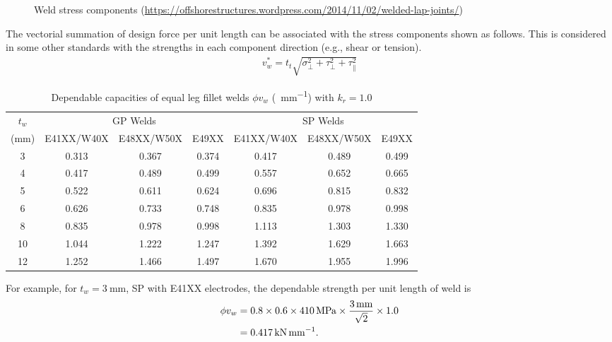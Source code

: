 \begin{figure}[H]
\centering

\caption{Weld stress components (\href{https://offshorestructures.wordpress.com/2014/11/02/welded-lap-joints/}{\url{https://offshorestructures.wordpress.com/2014/11/02/welded-lap-joints/}})}
\end{figure}
The vectorial summation of design force per unit length can be associated with the stress components shown as follows. This is considered in some other standards with the strengths in each component direction (e.g., shear or tension).
\begin{gather}
v_w^*=t_t\sqrt{\sigma_\perp^2+\tau_\perp^2+\tau_\parallel^2}
\end{gather}
\begin{table}[H]
\centering\footnotesize
\caption{Dependable capacities of equal leg fillet welds $\phi{}v_w$ (\si{\kn\per\mm}) with $k_r=1.0$}\label{tab:phi_v_w}
\begin{tabular}{c|c|c|c|c|c|c}
    \toprule
      $t_w$    &  \multicolumn{3}{c|}{GP Welds}  &  \multicolumn{3}{c}{SP Welds}   \\
    (\si{\mm}) & E41XX/W40X & E48XX/W50X & E49XX & E41XX/W40X & E48XX/W50X & E49XX \\ \midrule
        3      &   0.313    &   0.367    & 0.374 &   0.417    &   0.489    & 0.499 \\
        4      &   0.417    &   0.489    & 0.499 &   0.557    &   0.652    & 0.665 \\
        5      &   0.522    &   0.611    & 0.624 &   0.696    &   0.815    & 0.832 \\
        6      &   0.626    &   0.733    & 0.748 &   0.835    &   0.978    & 0.998 \\
        8      &   0.835    &   0.978    & 0.998 &   1.113    &   1.303    & 1.330 \\
        10     &   1.044    &   1.222    & 1.247 &   1.392    &   1.629    & 1.663 \\
        12     &   1.252    &   1.466    & 1.497 &   1.670    &   1.955    & 1.996 \\ \bottomrule
\end{tabular}
\end{table}

For example, for $t_w=\SI{3}{\mm}$, SP with E41XX electrodes, the dependable strength per unit length of weld is
\begin{align*}
\phi{}v_w&=0.8\times0.6\times\SI{410}{\mega\pascal}\times\dfrac{\SI{3}{\milli\meter}}{\sqrt{2}}\times1.0\\
&=\SI{0.417}{\kilo\newton\per\milli\meter}.
\end{align*}

